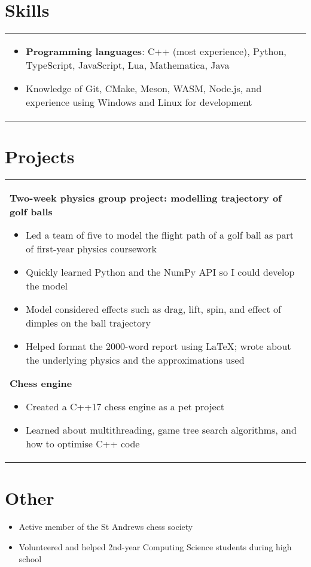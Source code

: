 \documentclass{article}
\begin{document}
	\section*{Skills}
	\begin{tabular}{p{15.6cm}}
		\vspace{-\topsep}
		\begin{itemize}
			\vspace{-\topsep}
			\item \textbf{Programming languages}: C++ (most experience), Python, TypeScript, JavaScript, Lua, Mathematica, Java
			\item Knowledge of Git, CMake, Meson, WASM, Node.js, and experience using Windows and Linux for development
		\end{itemize}
	\end{tabular}
	\vspace{-1ex}
	
	\section*{Projects}
	\begin{tabular}{p{15.6cm}}
		\textbf{Two-week physics group project: modelling trajectory of golf balls}
		\begin{itemize}
			\item Led a team of five to model the flight path of a golf ball as part of first-year physics coursework
			\item Quickly learned Python and the NumPy API so I could develop the model
			\item Model considered effects such as drag, lift, spin, and effect of dimples on the ball trajectory
			\item Helped format the 2000-word report using LaTeX; wrote about the underlying physics and the approximations used
		\end{itemize}
		
		\textbf{Chess engine}
		\begin{itemize}
			\item Created a C++17 chess engine as a pet project
			\item Learned about multithreading, game tree search algorithms, and how to optimise C++ code
		\end{itemize}
	\end{tabular}
	\vspace{-1ex}
	
	\section*{Other}
	\begin{itemize}
		\item Active member of the St Andrews chess society
		\item Volunteered and helped 2nd-year Computing Science students during high school
	\end{itemize}
	
\end{document}
